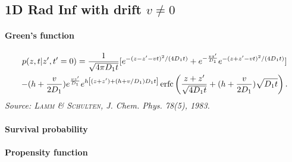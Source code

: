 
\subsection{1D Rad Inf with drift $v\neq 0$}

\paragraph{Green's function}
\begin{multline}
  p(z,t|z',t'=0) = \frac{1}{\sqrt{4\pi D_1 t}} [
			e^{-(z-z'-vt)^2/(4 D_1 t)} +
  e^{-\frac{vz'}{D_1}}	e^{-(z+z'-vt)^2/(4 D_1 t)} ] \\
  -(h+\frac{v}{2D_1}) e^{\frac{vz'}{D_1}}
    e^{h \left[ (z+z') + (h + v/D_1) D_1 t \right]} \operatorname{erfc}\left(\frac{z+z'}{\sqrt{4D_1t}} + (h+\frac{v}{2D_1})\sqrt{D_1t} \right) 
  .\label{green-promoter-solo-drift}
\end{multline}
\textit{Source: \textsc{Lamm \& Schulten}, J. Chem. Phys. 78(5), 1983.}

\paragraph{Survival probability}

\paragraph{Propensity function}
